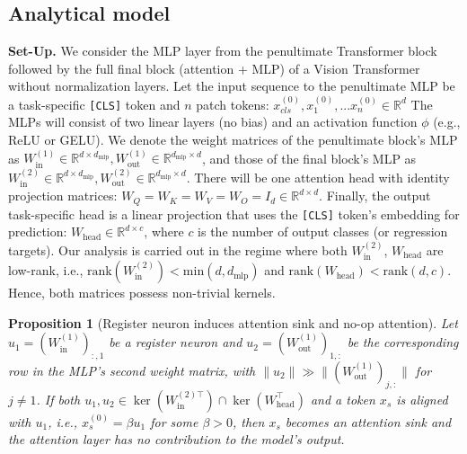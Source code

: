 \documentclass{article}
\begin{document}
\subsection{Analytical model}
\textbf{Set-Up.}
We consider the MLP layer from the penultimate Transformer block followed by the full final block (attention + MLP) of a Vision Transformer without normalization layers. Let the input sequence to the penultimate MLP be a task-specific \texttt{[CLS]} token and $n$ patch tokens: $x^{(0)}_{cls}, x^{(0)}_1,...  x^{(0)}_n\in \mathbb{R}^{d}$ The MLPs will consist of two linear layers (no bias) and an activation function \( \phi \) (e.g., ReLU or GELU). We denote the weight matrices of the penultimate block's MLP as $W_{\text{in}}^{(1)} \in \mathbb{R}^{d \times d_{\text{mlp}}}, W_{\text{out}}^{(1)} \in \mathbb{R}^{d_{\text{mlp}} \times d}$, and those of the final block's MLP as $W_{\text{in}}^{(2)} \in \mathbb{R}^{d \times d_{\text{mlp}}}, W_{\text{out}}^{(2)} \in \mathbb{R}^{d_{\text{mlp}} \times d}$. There will be one attention head with identity projection matrices: \( W_Q = W_K = W_V = W_O = I_d \in \mathbb{R}^{d \times d} \). Finally, the output task-specific head is a linear projection that uses the \texttt{[CLS]} token's embedding for prediction: $W_{\text{head}} \in \mathbb{R}^{d \times c}$,  where \( c \) is the number of output classes (or regression targets). Our analysis is carried out in the regime where both $W_{\text{in}}^{(2)}$, $W_{\text{head}}$  are low-rank, i.e., $\mathrm{rank}(W_{\text{in}}^{(2)})< \mathrm{min}(d,d_{\text{mlp}})$ and
$\mathrm{rank}(W_{\text{head}})< \mathrm{rank}(d,c)$. Hence, both matrices possess non-trivial kernels. 



\newtheorem{proposition}{Proposition}
\begin{proposition}[Register neuron induces attention sink and no-op attention]
\label{prop:register_sink}
Let $u_1 = (W_{\text{in}}^{(1)})_{:, 1}$
be a register neuron and $u_2 = (W_{\text{out}}^{(1)})_{1, :}$
be the corresponding row in the MLP's second weight matrix, with $\|u_2\|
 \gg\|(W_{\text{out}}^{(1)})_{j,:}\|$ for $j \neq 1$.
If both $u_1, u_2 \in \ker(W_{\text{in}}^{(2)\top}) \cap \ker(W^\top_{\text{head}})$ and a token $x_s$ is aligned with $u_1$, i.e., $x^{(0)}_s = \beta u_1$ for some $\beta > 0$,
then $x_s$ becomes an attention sink and the attention layer has no contribution to the model's output.
\end{proposition}
\end{document}
